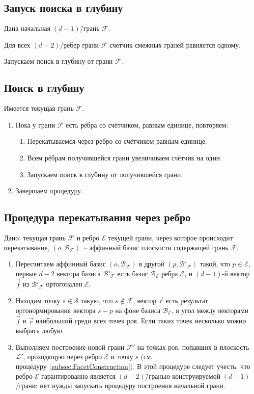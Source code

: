 \documentclass[a4paper,12pt]{article}
\newcommand{\Swarm}{\mathcal{S}} %
\newcommand{\Facet}{\mathcal{F}} %
\newcommand{\Edge}{\mathcal{E}} %
\newcommand{\Basis}{\mathcal{B}} %
\newcommand{\Plane}{\mathcal{L}} %
\begin{document}
  \subsection{Запуск поиска в глубину}
    Дана начальная $(d-1)$\=/грань $\Facet$.

    Для всех $(d-2)$\-/рёбер грани $\Facet$ счётчик смежных граней равняется одному.

    Запускаем поиск в глубину от грани $\Facet$.
  \subsection{Поиск в глубину}

    Имеется текущая грань $\Facet$.
    \begin{enumerate}
      \item Пока у грани $\Facet$ есть рёбра со счётчиком, равным единице, повторяем:
      \begin{enumerate}
        \item Перекатываемся через ребро со счётчиком равным единице.
        \item Всем рёбрам получившейся грани увеличиваем счётчик на один.
        \item Запускаем поиск в глубину от получившейся грани.
      \end{enumerate}
      \item Завершаем процедуру.
    \end{enumerate}

  \subsection{Процедура перекатывания через ребро}
    Дано: текущая грань $\Facet$ и ребро $\Edge$ текущей грани, через которое происходит перекатывание, $(o, \Basis_{\Facet})$~-- аффинный базис плоскости содержащей грань $\Facet$.

    \begin{enumerate}
      \item Пересчитаем аффинный базис $(o, \Basis_{\Facet})$ в другой $(p, \Basis'_{\Facet})$ такой, что $p \in \Edge$, первые $d-2$ вектора базиса $\Basis'_{\Facet}$ есть базис $\Basis_{\Edge}$ ребра $\Edge$, и $(d-1)$-й вектор $\vec f$ из $\Basis'_{\Facet}$ ортогонален $\Edge$.
      \item Находим точку $s \in \Swarm$ такую, что $s \notin \Facet$, вектор $\vec r$ есть результат ортонормирования вектора $s - p$ на фоне базиса $\Basis_{\Edge}$, и угол между векторами $\vec f$ и $\vec r$ наибольший среди всех точек роя. Если таких точек несколько можно выбрать любую.
      \item Выполняем построение новой грани $\Facet'$ на точках роя, попавших в плоскость $\Plane'$, проходящую через ребро $\Edge$ и точку $s$ (см. процедуру~\ref{subsec:FacetConstruction}). В этой процедуре следует учесть, что ребро $\Edge$ гарантированно является $(d-2)$\=/гранью конструируемой $(d-1)$\=/грани: нет нужды запускать процедуру построения начальной грани.
    \end{enumerate}
\end{document}
